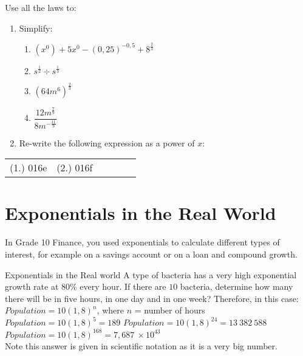 

{
Use all the laws to:
\begin{enumerate}
\item{Simplify:

\begin{enumerate}
\item$(x^0)+5x^0-(0,25)^{-0,5}+8^{\frac{2}{3}}$ 
\item$s^{\frac{1}{2}}\div s^{\frac{1}{3}}$\\
\item$(64m^6)^\frac{2}{3}$\\
\item $\dfrac{12m^{\frac{7}{9}}}{8m^{-\frac{11}{9}}}$\\

\end{enumerate}
}
\item{Re-write the following expression as a power of $x$:
}
\end{enumerate}


\par \practiceinfo
\par \begin{tabular}[h]{cccccc}
(1.)	016e	&
(2.)	016f	&
\end{tabular}}

\section{Exponentials in the Real World}
In Grade 10 Finance, you used exponentials to calculate different types of interest, for example on a savings account or on a loan and compound growth. 

\begin{wex}{Exponentials in the Real world}
{A type of bacteria has a very high exponential growth rate at $80\%$ every hour. If there are $10$ bacteria, determine how many there will be in five hours, in one day and in one week?}{ 
Therefore, in this case:\\
$Population = 10(1,8)^n$,   where $n$ = number of hours
$Population =10(1,8)^5 = 189$
$Population = 10(1,8)^{24} = 13~382~588$
$Population = 10(1,8)^{168} = 7,687 ~\times 10^{43}$\\
Note this answer is given in scientific notation as it is a very big number.}
\end{wex}

